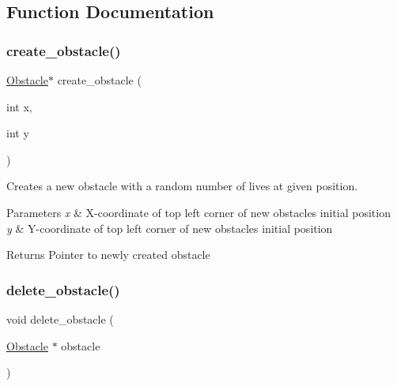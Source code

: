 \subsection{Function Documentation}
\hypertarget{group__obstacle_ga6624b86ef2320877c0935fb660f21dab}{}\label{group__obstacle_ga6624b86ef2320877c0935fb660f21dab} 
\subsubsection{\texorpdfstring{create\+\_\+obstacle()}{create\_obstacle()}}
{\footnotesize\ttfamily \hyperlink{struct_obstacle}{Obstacle}$\ast$ create\+\_\+obstacle (\begin{DoxyParamCaption}\item[{int}]{x,  }\item[{int}]{y }\end{DoxyParamCaption})}



Creates a new obstacle with a random number of lives at given position. 


\begin{DoxyParams}{Parameters}
{\em x} & X-\/coordinate of top left corner of new obstacle\textquotesingle{}s initial position \\
\hline
{\em y} & Y-\/coordinate of top left corner of new obstacle\textquotesingle{}s initial position \\
\hline
\end{DoxyParams}
\begin{DoxyReturn}{Returns}
Pointer to newly created obstacle 
\end{DoxyReturn}
\hypertarget{group__obstacle_ga97f5becf2591663ecfe77e6da1f6aa2e}{}\label{group__obstacle_ga97f5becf2591663ecfe77e6da1f6aa2e} 
\subsubsection{\texorpdfstring{delete\+\_\+obstacle()}{delete\_obstacle()}}
{\footnotesize\ttfamily void delete\+\_\+obstacle (\begin{DoxyParamCaption}\item[{\hyperlink{struct_obstacle}{Obstacle} $\ast$}]{obstacle }\end{DoxyParamCaption})}



